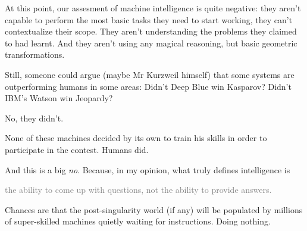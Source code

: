 At this point, our assesment of machine intelligence is quite negative: they 
aren't capable to perform the most basic tasks they need to start working, they 
can't contextualize their scope. They aren't understanding the problems they 
claimed to had learnt. And they aren't using any magical reasoning, but basic 
geometric transformations.

Still, someone could argue (maybe Mr Kurzweil himself) that some systems are 
outperforming humans in some areas: Didn't Deep Blue win Kasparov? Didn't IBM's 
Watson win Jeopardy?

No, they didn't.

None of these machines decided by its own to train his skills in order to 
participate in the contest. Humans did.

And this is a big \textit{no}. Because, in my opinion, what truly defines 
intelligence is

\textcolor{gray}{
	\Large{
		the ability to come up with questions, not the ability to provide 
		answers.
	}
}

Chances are that the post-singularity world (if any) will be populated by 
millions of super-skilled machines quietly waiting for instructions. Doing nothing.